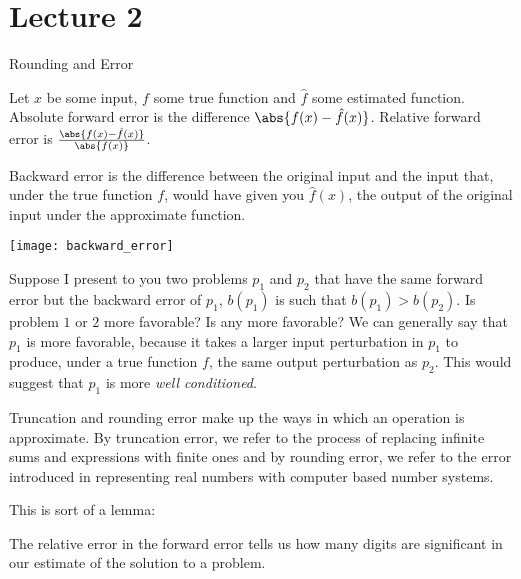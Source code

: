\documentclass[../main.tex]{subfiles}
\begin{document}
\section{Lecture 2}{Rounding and Error}


\begin{definition}
    Let $x$ be some input, $f$ some true function and $\hat{f}$ some estimated function. Absolute forward error is the difference
    $\abs{f(x) - \hat{f}(x)}$. Relative forward error is $\frac{\abs{f(x) - \hat{f}(x)}}{\abs{f(x)}}$.
\end{definition}

\begin{definition}
    Backward error is the difference between the original input and the input that, under the true function $f$, would have given
    you $\hat{f}(x)$, the output of the original input under the approximate function.
\end{definition}

\begin{center}
    \texttt{[image: backward\_error]}
\end{center}

\begin{remark}
    Suppose I present to you two problems $p_1$ and $p_2$ that have the same forward error but the backward error of $p_1$, $b(p_1)$ is
    such that $b(p_1) > b(p_2)$. Is problem $1$ or $2$ more favorable? Is any more favorable? We can generally say that $p_1$ is more favorable, because it takes a larger input perturbation in $p_1$ to produce, under a true function $f$, the same output perturbation as $p_2$. This would suggest that $p_1$ is more \textit{well conditioned}.
\end{remark}

\begin{remark}
    Truncation and rounding error make up the ways in which an operation is approximate. By truncation error, we refer to the process of replacing infinite sums and expressions with finite ones and by rounding error, we refer to the error introduced in representing real numbers with computer based number systems.
\end{remark}

\begin{lemma}
    This is sort of a lemma:

    The relative error in the forward error tells us how many digits are significant in our estimate of the solution to a problem.
\end{lemma}
\end{document}
